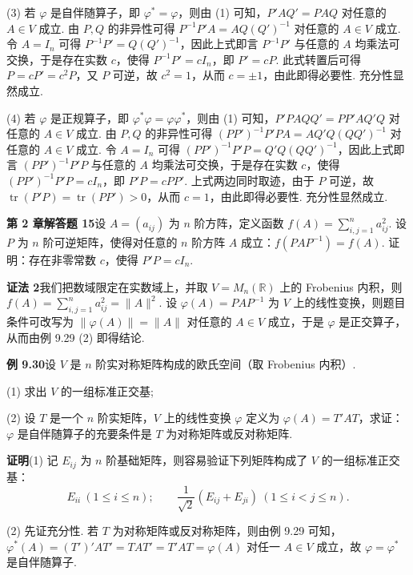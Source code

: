 \documentclass[UTF8,12pt,a4paper,fontset=fandol]{ctexart}
\begin{document}
(3) 若 $\varphi$ 是自伴随算子，即 $\varphi^*=\varphi$，则由 (1) 可知，$P'AQ'=PAQ$ 对任意的 $A\in V$ 成立. 由 $P,Q$ 的非异性可得 $P^{-1}P'A=AQ(Q')^{-1}$ 对任意的 $A\in V$ 成立. 令 $A=I_n$ 可得 $P^{-1}P'=Q(Q')^{-1}$，因此上式即言 $P^{-1}P'$ 与任意的 $A$ 均乘法可交换，于是存在实数 $c$，使得 $P^{-1}P'=cI_n$，即 $P'=cP$. 此式转置后可得 $P=cP'=c^2P$，又 $P$ 可逆，故 $c^2=1$，从而 $c=\pm1$，由此即得必要性. 充分性显然成立.

(4) 若 $\varphi$ 是正规算子，即 $\varphi^*\varphi=\varphi\varphi^*$，则由 (1) 可知，$P'PAQQ'=PP'AQ'Q$ 对任意的 $A\in V$ 成立. 由 $P,Q$ 的非异性可得 $(PP')^{-1}P'PA=AQ'Q(QQ')^{-1}$ 对任意的 $A\in V$ 成立. 令 $A=I_n$ 可得 $(PP')^{-1}P'P=Q'Q(QQ')^{-1}$，因此上式即言 $(PP')^{-1}P'P$ 与任意的 $A$ 均乘法可交换，于是存在实数 $c$，使得 $(PP')^{-1}P'P=cI_n$，即 $P'P=cPP'$. 上式两边同时取迹，由于 $P$ 可逆，故 $\operatorname{tr}(P'P)=\operatorname{tr}(PP')>0$，从而 $c=1$，由此即得必要性. 充分性显然成立.

\noindent\textbf{第 2 章解答题 15}\quad 设 $A=(a_{ij})$ 为 $n$ 阶方阵，定义函数 $f(A)=\sum_{i,j=1}^n a_{ij}^2$. 设 $P$ 为 $n$ 阶可逆矩阵，使得对任意的 $n$ 阶方阵 $A$ 成立：$f(PAP^{-1})=f(A)$. 证明：存在非零常数 $c$，使得 $P'P=cI_n$.

\noindent\textbf{证法 2}\quad 我们把数域限定在实数域上，并取 $V=M_n(\mathbb{R})$ 上的 Frobenius 内积，则 $f(A)=\sum_{i,j=1}^n a_{ij}^2=\|A\|^2$. 设 $\varphi(A)=PAP^{-1}$ 为 $V$ 上的线性变换，则题目条件可改写为 $\|\varphi(A)\|=\|A\|$ 对任意的 $A\in V$ 成立，于是 $\varphi$ 是正交算子，从而由例 9.29 (2) 即得结论.

\noindent\textbf{例 9.30}\quad 设 $V$ 是 $n$ 阶实对称矩阵构成的欧氏空间（取 Frobenius 内积）.

(1) 求出 $V$ 的一组标准正交基;

(2) 设 $T$ 是一个 $n$ 阶实矩阵，$V$ 上的线性变换 $\varphi$ 定义为 $\varphi(A)=T'AT$，求证：$\varphi$ 是自伴随算子的充要条件是 $T$ 为对称矩阵或反对称矩阵.

\noindent\textbf{证明}\quad (1) 记 $E_{ij}$ 为 $n$ 阶基础矩阵，则容易验证下列矩阵构成了 $V$ 的一组标准正交基：
\[
E_{ii}\ (1\le i\le n);\qquad \frac1{\sqrt2}(E_{ij}+E_{ji})\ (1\le i<j\le n).
\]

(2) 先证充分性. 若 $T$ 为对称矩阵或反对称矩阵，则由例 9.29 可知，$\varphi^*(A)=(T')'AT'=TAT'=T'AT=\varphi(A)$ 对任一 $A\in V$ 成立，故 $\varphi=\varphi^*$ 是自伴随算子.
\end{document}
